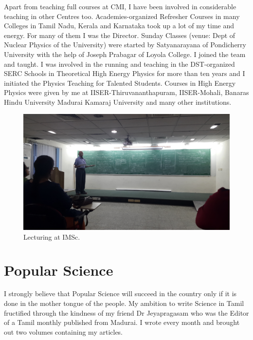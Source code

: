 Apart from teaching full courses at CMI, I have been involved in 
considerable teaching in other Centres too. Academies-organized 
Refresher Courses in many Colleges in Tamil Nadu, Kerala and Karnataka 
took up a lot of my time and energy. For many of them I was the 
Director. Sunday Classes (venue: Dept of Nuclear Physics of the 
University) were started by Satyanarayana of Pondicherry University with 
the help of Joseph Prabagar of Loyola College. I joined the team and 
taught. I was involved in the running and teaching in the DST-organized 
SERC Schools in Theoretical High Energy Physics for more than ten years 
and I initiated the Physics Teaching for Talented Students. Courses in 
High Energy Physics were given by me at IISER-Thiruvananthapuram, 
IISER-Mohali, Banaras Hindu University Madurai Kamaraj University and 
many other institutions.
\medskip

\begin{figure}[h]
\centering
\includegraphics[width=\textwidth]{images/rajaji-teach1.jpg}
\caption{Lecturing at IMSc.}
\end{figure}

\section*{Popular Science}

I strongly believe that Popular Science will succeed in the country
only if it is done 
in the mother tongue of the people. My ambition to write Science in Tamil 
fructified through the kindness of my friend Dr Jeyapragasam who was the 
Editor of a Tamil monthly published from Madurai. I wrote every month 
and brought out two volumes containing my articles.
\bigskip

